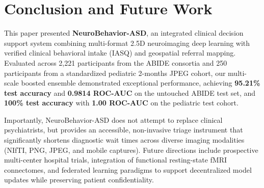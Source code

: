 \documentclass[conference]{IEEEtran}
\begin{document}
\section{Conclusion and Future Work}
This paper presented \textbf{NeuroBehavior-ASD}, an integrated clinical decision support system combining multi-format 2.5D neuroimaging deep learning with verified clinical behavioral intake (IASQ) and geospatial referral mapping. Evaluated across 2,221 participants from the ABIDE consortia and 250 participants from a standardized pediatric 2-months JPEG cohort, our multi-scale boosted ensemble demonstrated exceptional performance, achieving \textbf{95.21\% test accuracy} and \textbf{0.9814 ROC-AUC} on the untouched ABIDE test set, and \textbf{100\% test accuracy} with \textbf{1.00 ROC-AUC} on the pediatric test cohort.

Importantly, NeuroBehavior-ASD does not attempt to replace clinical psychiatrists, but provides an accessible, non-invasive triage instrument that significantly shortens diagnostic wait times across diverse imaging modalities (NIfTI, PNG, JPEG, and mobile captures). Future directions include prospective multi-center hospital trials, integration of functional resting-state fMRI connectomes, and federated learning paradigms to support decentralized model updates while preserving patient confidentiality.
\end{document}
